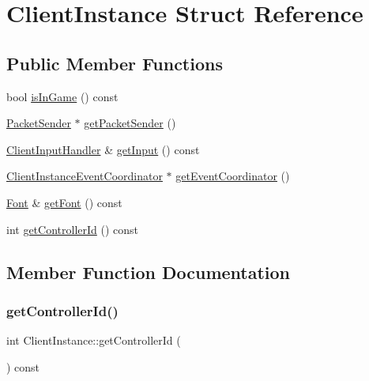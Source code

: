 \hypertarget{struct_client_instance}{}\section{Client\+Instance Struct Reference}
\label{struct_client_instance}
\subsection*{Public Member Functions}
\begin{DoxyCompactItemize}
\item 
bool \mbox{\hyperlink{struct_client_instance_ad2672f5b5b1b5e7ee5eda83e527cd753}{is\+In\+Game}} () const
\item 
\mbox{\hyperlink{struct_packet_sender}{Packet\+Sender}} $\ast$ \mbox{\hyperlink{struct_client_instance_aad3a481a0988c04c3fade2b7f7e401b0}{get\+Packet\+Sender}} ()
\item 
\mbox{\hyperlink{struct_client_input_handler}{Client\+Input\+Handler}} \& \mbox{\hyperlink{struct_client_instance_a34c87a5603c81ffcc160f97bc6006949}{get\+Input}} () const
\item 
\mbox{\hyperlink{struct_client_instance_event_coordinator}{Client\+Instance\+Event\+Coordinator}} $\ast$ \mbox{\hyperlink{struct_client_instance_a3135a3b7826f22211bf69d688a8ac81b}{get\+Event\+Coordinator}} ()
\item 
\mbox{\hyperlink{struct_font}{Font}} \& \mbox{\hyperlink{struct_client_instance_a203b51aeab4a317a4e491af589b43eaa}{get\+Font}} () const
\item 
int \mbox{\hyperlink{struct_client_instance_a80878816c82f930b5845ab48a0a3b7a8}{get\+Controller\+Id}} () const
\end{DoxyCompactItemize}


\subsection{Member Function Documentation}
\mbox{\label{struct_client_instance_a80878816c82f930b5845ab48a0a3b7a8}} 
\subsubsection{\texorpdfstring{getControllerId()}{getControllerId()}}
{\footnotesize\ttfamily int Client\+Instance\+::get\+Controller\+Id (\begin{DoxyParamCaption}{ }\end{DoxyParamCaption}) const}

